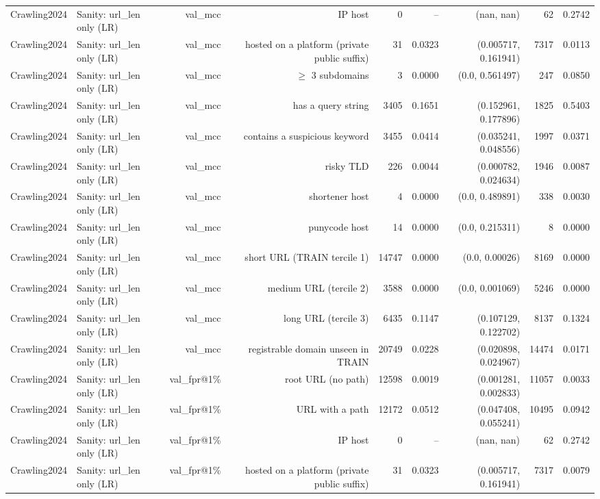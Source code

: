\begin{table}[t]
\begin{tabular}{llrrrrrrr}
Crawling2024 & Sanity: url\_len only (LR) & val\_mcc & IP host & 0 & -- & (nan, nan) & 62 & 0.2742 \\
Crawling2024 & Sanity: url\_len only (LR) & val\_mcc & hosted on a platform (private public suffix) & 31 & 0.0323 & (0.005717, 0.161941) & 7317 & 0.0113 \\
Crawling2024 & Sanity: url\_len only (LR) & val\_mcc & $\geq$ 3 subdomains & 3 & 0.0000 & (0.0, 0.561497) & 247 & 0.0850 \\
Crawling2024 & Sanity: url\_len only (LR) & val\_mcc & has a query string & 3405 & 0.1651 & (0.152961, 0.177896) & 1825 & 0.5403 \\
Crawling2024 & Sanity: url\_len only (LR) & val\_mcc & contains a suspicious keyword & 3455 & 0.0414 & (0.035241, 0.048556) & 1997 & 0.0371 \\
Crawling2024 & Sanity: url\_len only (LR) & val\_mcc & risky TLD & 226 & 0.0044 & (0.000782, 0.024634) & 1946 & 0.0087 \\
Crawling2024 & Sanity: url\_len only (LR) & val\_mcc & shortener host & 4 & 0.0000 & (0.0, 0.489891) & 338 & 0.0030 \\
Crawling2024 & Sanity: url\_len only (LR) & val\_mcc & punycode host & 14 & 0.0000 & (0.0, 0.215311) & 8 & 0.0000 \\
Crawling2024 & Sanity: url\_len only (LR) & val\_mcc & short URL (TRAIN tercile 1) & 14747 & 0.0000 & (0.0, 0.00026) & 8169 & 0.0000 \\
Crawling2024 & Sanity: url\_len only (LR) & val\_mcc & medium URL (tercile 2) & 3588 & 0.0000 & (0.0, 0.001069) & 5246 & 0.0000 \\
Crawling2024 & Sanity: url\_len only (LR) & val\_mcc & long URL (tercile 3) & 6435 & 0.1147 & (0.107129, 0.122702) & 8137 & 0.1324 \\
Crawling2024 & Sanity: url\_len only (LR) & val\_mcc & registrable domain unseen in TRAIN & 20749 & 0.0228 & (0.020898, 0.024967) & 14474 & 0.0171 \\
Crawling2024 & Sanity: url\_len only (LR) & val\_fpr@1\% & root URL (no path) & 12598 & 0.0019 & (0.001281, 0.002833) & 11057 & 0.0033 \\
Crawling2024 & Sanity: url\_len only (LR) & val\_fpr@1\% & URL with a path & 12172 & 0.0512 & (0.047408, 0.055241) & 10495 & 0.0942 \\
Crawling2024 & Sanity: url\_len only (LR) & val\_fpr@1\% & IP host & 0 & -- & (nan, nan) & 62 & 0.2742 \\
Crawling2024 & Sanity: url\_len only (LR) & val\_fpr@1\% & hosted on a platform (private public suffix) & 31 & 0.0323 & (0.005717, 0.161941) & 7317 & 0.0079 \\

\end{tabular}
\end{table}
